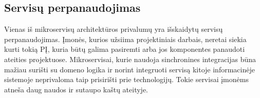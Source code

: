 \subsection{Servisų perpanaudojimas}

Vienas iš mikroservisų architektūros privalumų yra išskaidytų servisų perpanaudojimas. Įmonės, kurios užsiima projektiniais darbais,
neretai siekia kurti tokią PĮ, kuria būtų galima pasiremti arba jos komponentes panaudoti ateities projektuose. Mikroservisai, kurie naudoja 
sinchronines integracijas būna mažiau surišti su domeno logika ir norint integruoti servisą kitoje informacinėje sistemoje
neprivaloma taip prisirišti prie technologijų. Tokie servisai įmonėms atneša daug naudos ir sutaupo kaštų ateityje.
